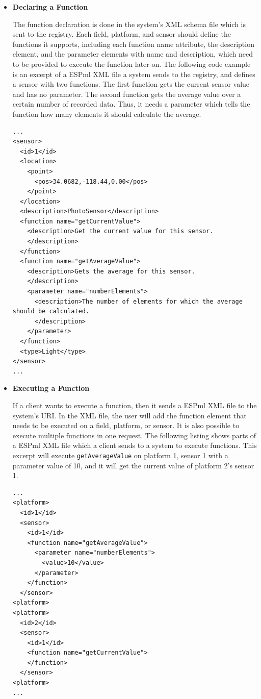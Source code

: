 \begin{itemize}
\item \textbf{Declaring a Function}

The function declaration is done in the system's XML schema file which
is sent to the registry. Each field, platform, and sensor should
define the functions it supports, including each function name
attribute, the description element, and the parameter elements with
name and description, which need to be provided to execute the
function later on. The following code example is an excerpt of a ESPml
XML file a system sends to the registry, and defines a sensor with
two functions. The first function gets the current sensor value and has no
parameter. The second function gets the average value over a certain number
of recorded data. Thus, it needs a parameter which tells the function
how many elements it should calculate the average.

\lstset{basicstyle=\small,breaklines=true}
\begin{lstlisting}
...
<sensor>
  <id>1</id>
  <location>
    <point>
      <pos>34.0682,-118.44,0.00</pos>
    </point>
  </location>
  <description>PhotoSensor</description>
  <function name="getCurrentValue">
    <description>Get the current value for this sensor.
    </description>
  </function>
  <function name="getAverageValue">
    <description>Gets the average for this sensor.
    </description>
    <parameter name="numberElements">
      <description>The number of elements for which the average should be calculated.
      </description>
    </parameter>
  </function>
  <type>Light</type>
</sensor>
...
\end{lstlisting}


\item \textbf{Executing a Function}

If a client wants to execute a function, then it sends a ESPml XML
file to the system's URI. In the XML file, the user will add the function
element that needs to be executed on a field, platform, or sensor. 
It is also possible to execute multiple functions in one
request. The following listing shows parts of a ESPml XML file which
a client sends to a system to execute functions. This excerpt will
execute \verb|getAverageValue| on platform 1, sensor 1 with a
parameter value of 10, and it will get the current value of platform
2's sensor 1.

\lstset{basicstyle=\small,breaklines=true}
\begin{lstlisting}
...
<platform>
  <id>1</id>
  <sensor>
    <id>1</id> 
    <function name="getAverageValue">
      <parameter name="numberElements">
        <value>10</value>
      </parameter>
    </function>
  </sensor>
<platform>
<platform>
  <id>2</id>
  <sensor>
    <id>1</id> 
    <function name="getCurrentValue">
    </function>
  </sensor>
<platform>
...
\end{lstlisting}


\end{itemize}
